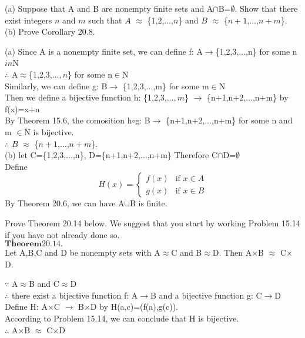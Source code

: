 \documentclass[11pt, a4paper, UTF8]{ctexart}
\begin{document}
\begin{problem}[UD:20.9]
(a) Suppose that A and B are nonempty finite sets and A$\cap$B=$\emptyset$. Show that there exist integers $n$ and $m$ such that $A$ $\approx$ \{1,2,$\dots$,$n$\} and $B$ $\approx$ \{$n+1$,$\dots$,$n+m$\}.\\
(b) Prove Corollary 20.8.
\end{problem}
\begin{solution}
(a) Since A is a nonempty finite set, we can define f: A$\rightarrow$\{1,2,3,$\dots$,n\} for some n$in$N\\
$\therefore$ A$\approx$\{1,2,3,$\dots,n$\} for some n$\in$N\\
Similarly, we can define g: B$\rightarrow$ \{1,2,3,$\dots$,m\} for some m$\in$N\\
Then we define a bijective function h: \{1,2,3,$\dots,m$\} $\rightarrow$ \{n+1,n+2,$\dots$,n+m\} by f(x)=x+n\\
By Theorem 15.6, the comosition h$\circ$g: B$\rightarrow$ \{n+1,n+2,$\dots$,n+m\} for some n and m $\in$N  is bijective.\\
$\therefore$ $B$ $\approx$ \{$n+1$,$\dots$,$n+m$\}.\\
(b) 
let C=\{1,2,3,$\dots$,n\}, D=\{n+1,n+2,$\dots$,n+m\}  Therefore C$\cap$D=$\emptyset$\\
Define 
\[H(x)= \begin{cases}
f(x) & \text{if } x\in A\\
g(x) & \text{if } x\in B
\end{cases}\]
By Theorem 20.6, we can have A$\cup$B is finite.

\end{solution}


\begin{problem}[UD:20.10]
Prove Theorem 20.14 below. We suggest that you start by working Problem 15.14 if you have not already done so.\\
$\boldsymbol{Theorem 20.14.}$\\
Let A,B,C and D be nonempty sets with A$\approx$C and B$\approx$D. Then A$\times$B $\approx$ C$\times$D.
\end{problem}
\begin{solution}
$\because$ A$\approx$B and C$\approx$D\\
$\therefore$ there exist a bijective function f: A$\rightarrow$B and a bijective function g: C$\rightarrow$D\\
Define H: A$\times$C $\rightarrow$ B$\times$D by H(a,c)=(f(a),g(c)).\\
According to Problem 15.14, we can conclude that H is bijective.\\
$\therefore$ A$\times$B $\approx$ C$\times$D

\end{solution}
\end{document}
